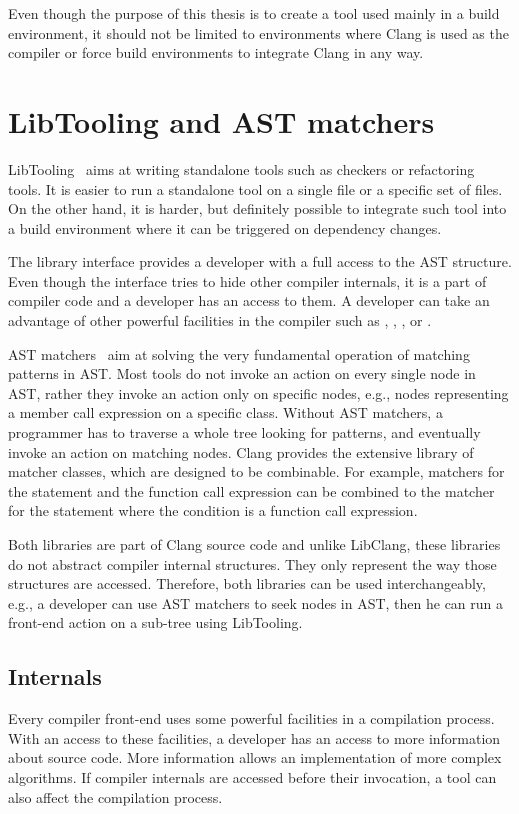 Even though the purpose of this thesis is to create a tool used mainly in a build environment, it should not be limited to environments where Clang is used as the compiler or force build environments to integrate Clang in any way.

\section{LibTooling and AST matchers}
LibTooling~\cite{clang-libtooling} aims at writing standalone tools such as checkers or refactoring tools. It is easier to run a standalone tool on a single file or a specific set of files. On the other hand, it is harder, but definitely possible to integrate such tool into a build environment where it can be triggered on dependency changes.

The library interface provides a developer with a full access to the AST structure. Even though the interface tries to hide other compiler internals, it is a part of compiler code and a developer has an access to them. A developer can take an advantage of other powerful facilities in the compiler such as , , ,  or .

AST matchers~\cite{clang-matchers} aim at solving the very fundamental operation of matching patterns in AST. Most tools do not invoke an action on every single node in AST, rather they invoke an action only on specific nodes, e.g., nodes representing a member call expression on a specific class. Without AST matchers, a programmer has to traverse a whole tree looking for patterns, and eventually invoke an action on matching nodes. Clang provides the extensive library of matcher classes, which are designed to be combinable. For example, matchers for the  statement and the function call expression can be combined to the matcher for the  statement where the condition is a function call expression.

Both libraries are part of Clang source code and unlike LibClang, these libraries do not abstract compiler internal structures. They only represent the way those structures are accessed. Therefore, both libraries can be used interchangeably, e.g., a developer can use AST matchers to seek nodes in AST, then he can run a front-end action on a sub-tree using LibTooling.

\subsection{Internals}
Every compiler front-end uses some powerful facilities in a compilation process. With an access to these facilities, a developer has an access to more information about source code. More information allows an implementation of more complex algorithms. If compiler internals are accessed before their invocation, a tool can also affect the compilation process.

